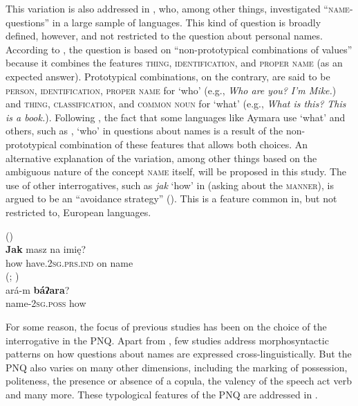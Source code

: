 \documentclass[output=paper,colorlinks,citecolor=brown]{langscibook}
\begin{document}
This variation is also addressed in \citet[61–94, passim]{Idiatov2007}, who, among other things, investigated “\textsc{name}-questions” in a large sample of languages. This kind of question is broadly defined, however, and not restricted to the question about personal names. According to \citet[47]{Idiatov2007}, the question is based on “non-prototypical combinations of values” because it combines the features \textsc{thing}, \textsc{identification}, and \textsc{proper name} (as an expected answer). Prototypical combinations, on the contrary, are said to be \textsc{person}, \textsc{identification}, \textsc{proper name} for ‘who’ (e.g., \textit{Who are you?} \textit{I’m Mike.}) and \textsc{thing}, \textsc{classification}, and \textsc{common noun} for ‘what’ (e.g., \textit{What is this?} \textit{This is a book.}). Following \citet{Idiatov2007}, the fact that some languages like Aymara use ‘what’ and others, such as , ‘who’ in questions about names is a result of the non-prototypical combination of these features that allows both choices. An alternative explanation of the variation, among other things based on the ambiguous nature of the concept \textsc{name} itself, will be proposed in this study.
The use of other interrogatives, such as \textit{jak} ‘how’ in  (asking about the \textsc{manner}), is argued to be an “avoidance strategy” (\citealt[61]{Idiatov2007}). This is a feature common in, but not restricted to, European languages.

\ea
    \label{example4.7}
     ()\\
    \gll \textbf{Jak}		masz			na		imię?\\
    how		have.2\textsc{sg.prs.ind}	on		name\\
\ex
    \label{example4.8}
     (; \citealt[406]{Lichtenberk1983})\\
    \gll ará-m			\textbf{báʔara}?\\
    name-2\textsc{sg.poss}		how\\
    \z

For some reason, the focus of previous studies has been on the choice of the interrogative in the PNQ. Apart from \citet[63–67]{Idiatov2007}, few studies address morphosyntactic patterns on how questions about names are expressed cross-linguistically. But the PNQ also varies on many other dimensions, including the marking of possession, politeness, the presence or absence of a copula, the valency of the speech act verb and many more. These typological features of the PNQ are addressed in .
\end{document}
